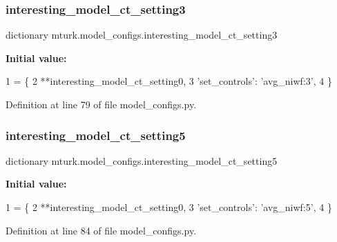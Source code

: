 \subsubsection{\texorpdfstring{interesting\+\_\+model\+\_\+ct\+\_\+setting3}{interesting\_model\_ct\_setting3}}
{\footnotesize\ttfamily dictionary mturk.\+model\+\_\+configs.\+interesting\+\_\+model\+\_\+ct\+\_\+setting3}

{\bfseries Initial value\+:}
\begin{DoxyCode}
1 =  \{
2     **interesting\_model\_ct\_setting0,
3     \textcolor{stringliteral}{'set\_controls'}: \textcolor{stringliteral}{'avg\_niwf:3'},
4 \}
\end{DoxyCode}


Definition at line 79 of file model\+\_\+configs.\+py.

\mbox{\label{namespacemturk_1_1model__configs_a77e670f5bb02fd126c69a1b06ecda8b0}} 
\subsubsection{\texorpdfstring{interesting\+\_\+model\+\_\+ct\+\_\+setting5}{interesting\_model\_ct\_setting5}}
{\footnotesize\ttfamily dictionary mturk.\+model\+\_\+configs.\+interesting\+\_\+model\+\_\+ct\+\_\+setting5}

{\bfseries Initial value\+:}
\begin{DoxyCode}
1 =  \{
2     **interesting\_model\_ct\_setting0,
3     \textcolor{stringliteral}{'set\_controls'}: \textcolor{stringliteral}{'avg\_niwf:5'},
4 \}
\end{DoxyCode}


Definition at line 84 of file model\+\_\+configs.\+py.

\mbox{\label{namespacemturk_1_1model__configs_a157d4b50457ea66bdf6090e6be1d4f6b}} 
